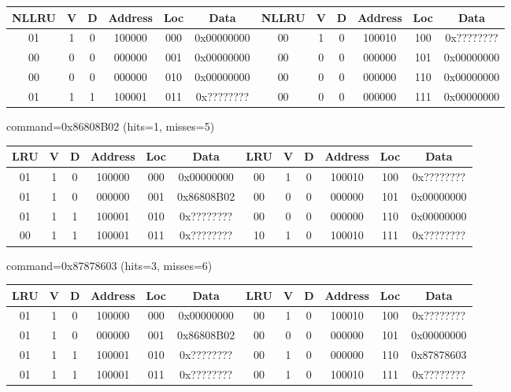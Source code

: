 \begin{enumerate}
{    \begin{tabular}{|c|c|c|c|c|c||c|c|c|c|c|c|} \hline
    NLLRU & V & D & Address & Loc & Data       & NLLRU & V & D & Address & Loc & Data        \\ \hline
    01    & 1 & 0 & 100000  & 000 & 0x00000000 & 00    & 1 & 0 & 100010  & 100 & 0x????????  \\ \hline
    00    & 0 & 0 & 000000  & 001 & 0x00000000 & 00    & 0 & 0 & 000000  & 101 & 0x00000000  \\ \hline
    00    & 0 & 0 & 000000  & 010 & 0x00000000 & 00    & 0 & 0 & 000000  & 110 & 0x00000000  \\ \hline
    01    & 1 & 1 & 100001  & 011 & 0x???????? & 00    & 0 & 0 & 000000  & 111 & 0x00000000  \\ \hline
    \end{tabular}


    command=0x86808B02 (hits=1, misses=5)

    \begin{tabular}{|c|c|c|c|c|c||c|c|c|c|c|c|} \hline
    LRU   & V & D & Address & Loc & Data       & LRU   & V & D & Address & Loc & Data        \\ \hline
    01    & 1 & 0 & 100000  & 000 & 0x00000000 & 00    & 1 & 0 & 100010  & 100 & 0x????????  \\ \hline
    01    & 1 & 0 & 000000  & 001 & 0x86808B02 & 00    & 0 & 0 & 000000  & 101 & 0x00000000  \\ \hline
    01    & 1 & 1 & 100001  & 010 & 0x???????? & 00    & 0 & 0 & 000000  & 110 & 0x00000000  \\ \hline
    00    & 1 & 1 & 100001  & 011 & 0x???????? & 10    & 1 & 0 & 100010  & 111 & 0x????????  \\ \hline
    \end{tabular}


    command=0x87878603 (hits=3, misses=6)

    \begin{tabular}{|c|c|c|c|c|c||c|c|c|c|c|c|} \hline
    LRU   & V & D & Address & Loc & Data       & LRU   & V & D & Address & Loc & Data        \\ \hline
    01    & 1 & 0 & 100000  & 000 & 0x00000000 & 00    & 1 & 0 & 100010  & 100 & 0x????????  \\ \hline
    01    & 1 & 0 & 000000  & 001 & 0x86808B02 & 00    & 0 & 0 & 000000  & 101 & 0x00000000  \\ \hline
    01    & 1 & 1 & 100001  & 010 & 0x???????? & 00    & 1 & 0 & 000000  & 110 & 0x87878603  \\ \hline
    01    & 1 & 1 & 100001  & 011 & 0x???????? & 00    & 1 & 0 & 100010  & 111 & 0x????????  \\ \hline
    \end{tabular}


}
\end{enumerate}
